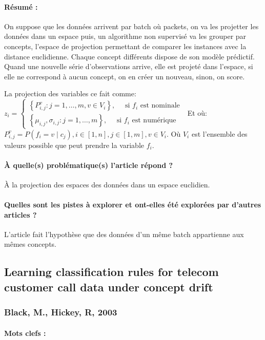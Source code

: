 \documentclass[11pt,a4paper]{report}
\begin{document}
\paragraph{Résumé :} On suppose que les données arrivent par batch où packets, on va les projetter les données dans un espace puis, un algorithme non supervisé va les grouper par concepts, l'espace de projection permettant de comparer les instances avec la distance euclidienne. Chaque concept différents dispose de son modèle prédictif. Quand une nouvelle série d'observations arrive, elle est projeté dans l'espace, si elle ne correspond à aucun concept, on en créer un nouveau, sinon, on score.

La projection des variables ce fait comme: $z_{i}=\left\{\begin{array}{l}
\left\{P_{i, j}^{v}: j=1, \ldots, m, v \in V_{i}\right\}, \quad \text { si } f_{i} \text { est nominale } \\
\left\{\mu_{i, j}, \sigma_{i, j}: j=1, \ldots, m\right\}, \quad \text { si } f_{i} \text { est numérique }
\end{array}\right.$
Et où:
$P_{i, j}^{v}=P\left(f_{i}=v \mid c_{j}\right), i \in[1, n], j \in[1, m], v \in V_{i}$. Où $V_{i}$ est l'ensemble des valeurs possible que peut prendre la variable $f_{i}$.
\paragraph{À quelle(s) problématique(s) l'article répond ?} À la projection des espaces des données dans un espace euclidien.

\paragraph{Quelles sont les pistes à explorer et ont-elles  été explorées par d'autres articles ?} L'article fait l'hypothèse que des données d'un même batch appartienne aux mêmes concepts.


\subsection{Learning classification rules for telecom  customer call data under concept drift}
\subsubsection{Black, M., Hickey, R, 2003}

\paragraph{Mots clefs :}
\end{document}

